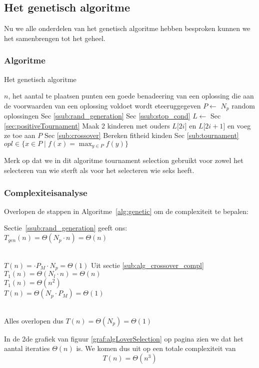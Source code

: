 %
\subsection{Het genetisch algoritme}
\label{ssub:genetic}
Nu we alle onderdelen van het genetisch algoritme hebben besproken kunnen we het samenbrengen tot het geheel.

\subsubsection{Algoritme}
	\begin{algorithm}[H]
	 	\caption{Het genetisch algoritme}
		\begin{algorithmic}
		\Require $n$, het aantal te plaatsen punten
		\Ensure een goede benadeering van een oplossing die aan de voorwaarden van een oplossing voldoet wordt eteeruggegeven
		\State $P \gets $ $N_p$ random oplossingen 
		\Comment Sec \ref{ssub:rand_generation}
		\Comment Sec \ref{ssub:stop_cond}
			\State $L \gets$  
			\Comment Sec \ref{sec:positiveTournament}
				\State Maak 2 kinderen met ouders 
				\State $L\lbrack2i\rbrack$ en  $L\lbrack2i+1\rbrack$ en voeg ze 
				\State toe aan $P$ 
				\Comment Sec \ref{sub:crossover}
				\State Bereken fitheid kinden
			\EndFor
			\State {} 
			\Comment Sec \ref{sub:tournament}
		\EndWhile 
		\State \Return  $\displaystyle opl \in \lbrace x \in P \mid f(x) = \max_{y\in P}{f(y)}  \rbrace$
		\EndFunction
		\end{algorithmic}
		\label{alg:genetic}
	\end{algorithm}		
    Merk op dat we in dit algoritme tournament selection gebruikt voor zowel het selecteren van wie sterft als voor het selecteren wie seks heeft. 
\subsubsection{Complexiteisanalyse}
  Overlopen de stappen in Algoritme~\ref{alg:genetic} om de complexiteit te bepalen:
\begin{enumerate}
	 Sectie~\ref{ssub:rand_generation} geeft ons:\\ $T_{gen}(n)=\Theta(N_p\cdot n) = \Theta(n)$ 
		\begin{enumerate}
			 \\$T(n)= \cdot P_M \cdot N_p = \Theta(1)$ 
			 Uit sectie \ref{sub:alg_crossover_compl}\\$T_{\text{1}}(n)= \Theta(N_l\cdot n) = \Theta(n)$
			 \\$T_{\text{1}}(n)= \Theta(n^2)$
			 \\$T(n)= \Theta(N_p\cdot P_M) = \Theta(1)$
		\end{enumerate}
		\\Alles overlopen dus $T(n)=\Theta(N_p)=\Theta(1)$
\end{enumerate}

In de 2de grafiek van figuur \ref{graf:algLoverSelection} op pagina \pageref{graf:algLoverSelection} zien we dat het aantal iteraties $\Theta(n)$ is. We komen dus uit op een totale complexiteit van \[T(n)=\Theta\left(n^3\right)\]

%